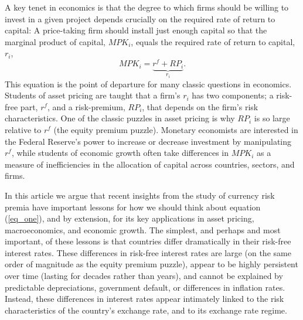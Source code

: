 \documentclass{ar-1col}
\begin{document}
A key tenet in economics is that the degree to which firms should be
willing to invest in a given project depends crucially on the required
rate of return to capital: A price-taking firm should install just
enough capital so that the marginal product of capital, $MPK_i$, equals
the required rate of return to capital,$r_i$, 
\begin{equation}
    MPK_i=\underbrace{r^f+RP_i}_{r_i}.
    \label{eq_one}
\end{equation} 
This equation is the point of departure for many classic questions in economics. Students of asset
pricing are taught that a firm's $r_i$ has two components; a risk-free
part, $r^f$, and a risk-premium, $RP_i$, that depends on the firm's
risk characteristics. One of the classic puzzles in asset pricing is
why $RP_i$ is so large relative to $r^f$ (the equity premium puzzle).
Monetary economists are interested in the Federal Reserve's power to increase or decrease investment by
manipulating $r^f$, while students of economic growth often take
differences in $MPK_i$ as a measure of inefficiencies in the
allocation of capital across countries, sectors, and firms.

In this article we argue that recent insights from the study of
currency risk premia have important lessons for how we should think
about equation (\ref{eq_one}), and by extension, for its key
applications in asset pricing, macroeconomics, and economic growth.
The simplest, and perhaps and most important, of these lessons is that
countries differ dramatically in their risk-free interest rates. These
differences in risk-free interest rates are large (on the same order
of magnitude as the equity premium puzzle), appear to be highly
persistent over time (lasting for decades rather than years), and
cannot be explained by predictable depreciations, government default,
or differences in inflation rates. Instead, these differences in
interest rates appear intimately linked to the risk characteristics of
the country's exchange rate, and to its exchange rate regime.
\end{document}
